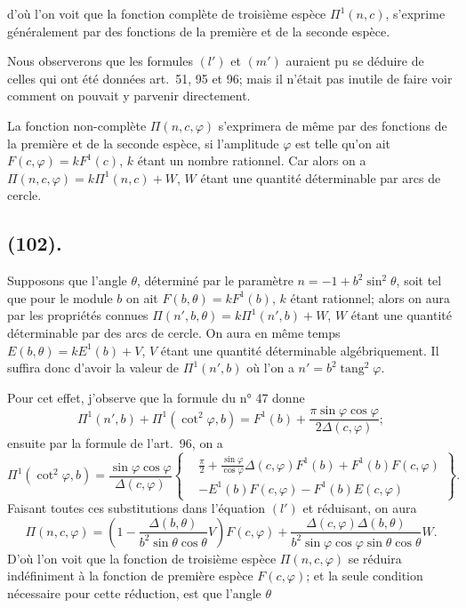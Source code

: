 \documentclass{article}
\begin{document}
d'où l'on voit que la fonction complète de troisième espèce $\Pi^{1}(n,c)$, s'exprime généralement par des fonctions de la première et de la seconde espèce.

Nous observerons que les formules $(l')$ et $(m')$ auraient pu se déduire de celles qui ont été données art.\ 51, 95 et 96; mais il n'était pas inutile de faire voir comment on pouvait y parvenir directement.

La fonction non-complète $\Pi(n,c,\varphi)$ s'exprimera de même par des fonctions de la première et de la seconde espèce, si l'amplitude $\varphi$ est telle qu'on ait $F(c,\varphi)=kF^{1}(c)$, $k$ étant un nombre rationnel. Car alors on a $\Pi(n,c,\varphi)=k\Pi^{1}(n,c)+W$, $W$ étant une quantité déterminable par arcs de cercle.

\subsection*{(102).}

Supposons que l'angle $\theta$, déterminé par le paramètre $n=-1+b^{2}\sin^{2}\theta$, soit tel que pour le module $b$ on ait $F(b,\theta)=kF^{1}(b)$, $k$ étant rationnel; alors on aura par les propriétés connues $\Pi(n',b,\theta)=k\Pi^{1}(n',b)+W$, $W$ étant une quantité déterminable par des arcs de cercle. On aura en même temps $E(b,\theta)=kE^{1}(b)+V$, $V$ étant une quantité déterminable algébriquement. Il suffira donc d'avoir la valeur de $\Pi^{1}(n',b)$ où l'on a $n'=b^{2}\operatorname{tang}^{2}\varphi$.

Pour cet effet, j'observe que la formule du n° 47 donne
\[ \Pi^{1}(n',b)+\Pi^{1}(\cot^{2}\varphi,b)=F^{1}(b)+\frac{\pi\sin\varphi\cos\varphi}{2\Delta(c,\varphi)}; \]
ensuite par la formule de l'art.\ 96, on a
\[ \Pi^{1}(\cot^{2}\varphi,b)=\frac{\sin\varphi\cos\varphi}{\Delta(c,\varphi)}\left\{\begin{aligned} &\frac{\pi}{2}+\frac{\sin\varphi}{\cos\varphi}\Delta(c,\varphi)F^{1}(b)+F^{1}(b)F(c,\varphi)\\ &-E^{1}(b)F(c,\varphi)-F^{1}(b)E(c,\varphi) \end{aligned}\right\}. \]
Faisant toutes ces substitutions dans l'équation $(l')$ et réduisant, on aura
\[ \Pi(n,c,\varphi)=\left(1-\frac{\Delta(b,\theta)}{b^{2}\sin\theta\cos\theta}V\right)F(c,\varphi)+\frac{\Delta(c,\varphi)\Delta(b,\theta)}{b^{2}\sin\varphi\cos\varphi\sin\theta\cos\theta}W. \]
D'où l'on voit que la fonction de troisième espèce $\Pi(n,c,\varphi)$ se réduira indéfiniment à la fonction de première espèce $F(c,\varphi)$; et la seule condition nécessaire pour cette réduction, est que l'angle $\theta$
\end{document}
